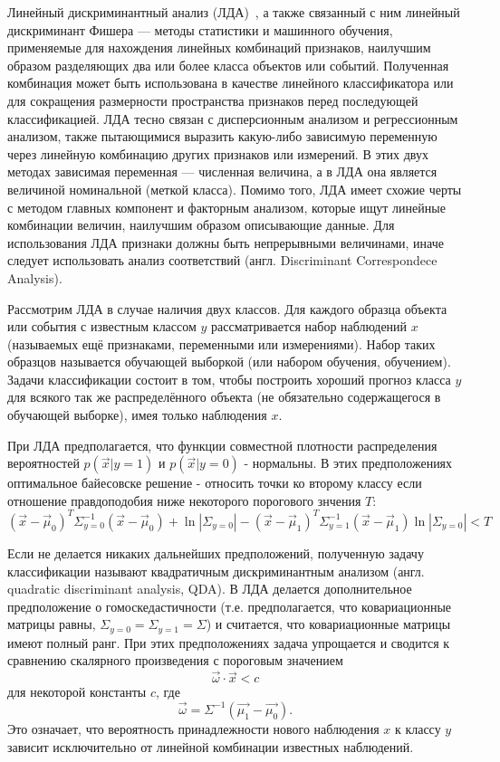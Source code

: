 \documentclass[a4paper,12pt]{report}
\numberwithin{equation}{section}
\begin{document}
Линейный дискриминантный анализ (ЛДА)~\cite{LDA}, а также связанный с ним
линейный дискриминант Фишера — методы статистики и машинного обучения,
применяемые для нахождения линейных комбинаций признаков, наилучшим образом
разделяющих два или более класса объектов или событий. Полученная комбинация
может быть использована в качестве линейного классификатора или для сокращения
размерности пространства признаков перед последующей классификацией. ЛДА тесно
связан с дисперсионным анализом и регрессионным анализом, также пытающимися
выразить какую-либо зависимую переменную через линейную комбинацию других
признаков или измерений. В этих двух методах зависимая переменная — численная
величина, а в ЛДА она является величиной номинальной (меткой класса). Помимо
того, ЛДА имеет схожие черты с методом главных компонент и факторным анализом,
которые ищут линейные комбинации величин, наилучшим образом описывающие
данные. Для использования ЛДА признаки должны быть непрерывными величинами,
иначе следует использовать анализ соответствий (англ. Discriminant Correspondece
Analysis).


Рассмотрим ЛДА в случае наличия двух классов. Для каждого образца объекта или
события с известным классом $y$ рассматривается набор наблюдений $x$ (называемых
ещё признаками, переменными или измерениями). Набор таких образцов называется
обучающей выборкой (или набором обучения, обучением). Задачи классификации
состоит в том, чтобы построить хороший прогноз класса $y$ для всякого так же
распределённого объекта (не обязательно содержащегося в обучающей выборке), имея
только наблюдения $x$.


При ЛДА предполагается, что функции совместной плотности распределения
вероятностей $p(\vec{x}|y=1)$ и $p(\vec{x}|y=0)$ - нормальны. В этих
предположениях оптимальное байесовске решение - относить точки ко второму классу
если отношение правдоподобия ниже некоторого порогового знчения $T$:
\[ (\vec{x}-\vec{\mu}_0)^T\Sigma_{y=0}^{-1}(\vec{x}-\vec{\mu}_0)+\ln{|\Sigma _{y=0}|}-(\vec{x}-\vec{\mu}_1)^T\Sigma _{y=1}^{-1}(\vec{x}-\vec{\mu}_1)\ln{|\Sigma_{y=0}|}<T \]


Если не делается никаких дальнейших предположений, полученную задачу
классификации называют квадратичным дискриминантным анализом (англ. quadratic
discriminant analysis, QDA). В ЛДА делается дополнительное предположение о
гомоскедастичности (т.е. предполагается, что ковариационные матрицы равны,
$\Sigma_{y=0}=\Sigma_{y=1}=\Sigma$) и считается, что ковариационные матрицы
имеют полный ранг. При этих предположениях задача упрощается и сводится к
сравнению скалярного произведения с пороговым значением
\[ \vec{\omega}\cdot\vec{x}<c \]
для некоторой константы $c$, где 
\[ \vec{\omega}=\Sigma^{-1}(\vec{\mu_1}-\vec{\mu_0}). \]
Это означает, что вероятность принадлежности нового наблюдения $x$ к классу $y$
зависит исключительно от линейной комбинации известных наблюдений.
\end{document}
